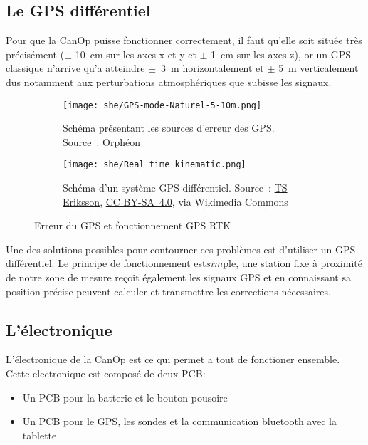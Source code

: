 \subsection{Le GPS différentiel}
\label{ssec_Gps_differenciel}
Pour que la CanOp puisse fonctionner correctement, il faut qu'elle soit située très précisément ($\pm$ 10~cm sur les axes x et y et $\pm$ 1~cm sur les axes z), or un GPS classique n'arrive qu’a atteindre $\pm$~3~m horizontalement et $\pm$ 5~m verticalement \cite{GPS_accuracy} dus notamment aux perturbations atmosphériques que subisse les signaux.
\begin{figure}

    \begin{subfigure}[t]{0.5\textwidth}
        \centering
        \texttt{[image: she/GPS-mode-Naturel-5-10m.png]}

        \caption[Source d'erreur des GPS]{Schéma présentant les sources d'erreur des GPS. Source~: Orphéon}
        \label{fig_GPS_error_source}
    \end{subfigure}
    \begin{subfigure}[t]{0.5\textwidth}
        \centering
        \texttt{[image: she/Real\_time\_kinematic.png]}

        \caption[Shema d'un systeme GPS differenciel]{Schéma d'un système GPS différentiel. Source~: \href{https://commons.wikimedia.org/wiki/File:Real_time_kinematic.svg}{TS Eriksson}, \href{https://creativecommons.org/licenses/by-sa/4.0}{CC BY-SA~4.0}, via Wikimedia Commons}
        \label{fig_RTK}
    \end{subfigure}
    \caption{Erreur du GPS et fonctionnement GPS RTK}
\end{figure}

Une des solutions possibles pour contourner ces problèmes est d'utiliser un GPS différentiel. Le principe de fonctionnement est$ sim$ple, une station fixe à proximité de notre zone de mesure reçoit également les signaux GPS et en connaissant sa position précise peuvent calculer et transmettre les corrections nécessaires. \cite{site:GPS_diff}

\subsection{L'électronique}

L'électronique de la CanOp est ce qui permet a tout de fonctioner ensemble. Cette electronique est composé de deux PCB:
\begin{itemize}
    \item Un PCB pour la batterie et le bouton pousoire
    \item Un PCB pour le GPS, les sondes et la communication bluetooth avec la tablette
\end{itemize}

